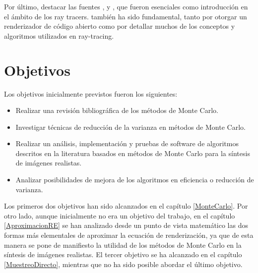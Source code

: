 Por último, destacar las fuentes \cite{Shirley2020RTW1}, \cite{Shirley2020RTW2} y \cite{Shirley2020RTW3}, que fueron esenciales como introducción en el ámbito de los ray tracers. \cite{Pharr2016} también ha sido fundamental, tanto por otorgar un renderizador de código abierto como por detallar muchos de los conceptos y algoritmos utilizados en ray-tracing. 

\chapter{Objetivos}

Los objetivos inicialmente previstos fueron los siguientes:

\begin{itemize}
\item Realizar una revisión bibliográfica de los métodos de Monte Carlo.
\item Investigar técnicas de reducción de la varianza en métodos de Monte Carlo.
\item Realizar un análisis, implementación y pruebas de software de algoritmos descritos en la literatura basados en métodos de Monte Carlo para la síntesis de imágenes realistas.
\item Analizar posibilidades de mejora de los algoritmos en eficiencia o reducción de varianza.
\end{itemize}

Los primeros dos objetivos han sido alcanzados en el capítulo \ref{MonteCarlo}. Por otro lado, aunque inicialmente no era un objetivo del trabajo, en el capítulo \ref{AproximacionRE} se han analizado desde un punto de vista matemático las dos formas más elementales de aproximar la ecuación de renderización, ya que de esta manera se pone de manifiesto la utilidad de los métodos de Monte Carlo en la síntesis de imágenes realistas. El tercer objetivo se ha alcanzado en el capítulo \ref{MuestreoDirecto}, mientras que no ha sido posible abordar el último objetivo.

